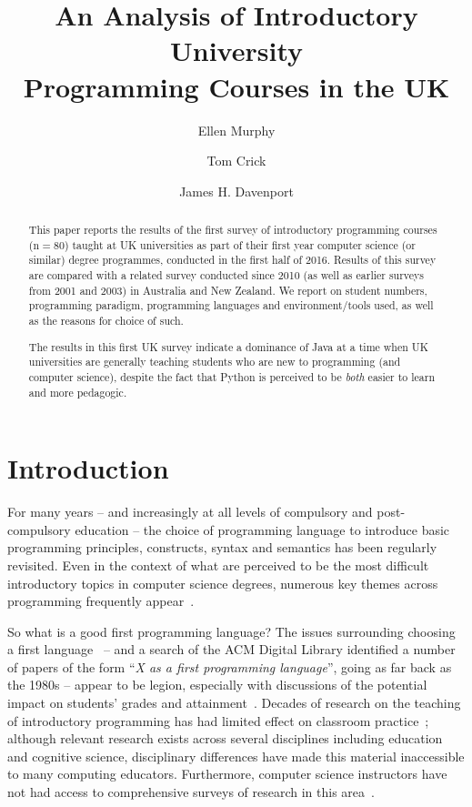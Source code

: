 \documentclass[a4paper,11pt]{article}
\title{An Analysis of Introductory University\\Programming Courses in
  the UK}
\author[1]{Ellen Murphy}
\author[2]{Tom Crick}
\author[3]{James H. Davenport}
\affil[1]{Institute for Mathematical Innovation, University of Bath, UK}
\affil[2]{Dept. of Computing, Cardiff Metropolitan University, UK}
\affil[3]{Dept. of Computer Science, University of Bath, UK}
\affil[1]{\url{e.murphy@bath.ac.uk}}
\affil[2]{\url{tcrick@cardiffmet.ac.uk}}
\affil[3]{\url{j.h.davenport@bath.ac.uk}}
\begin{document}
\maketitle


\begin{abstract}
This paper reports the results of the first survey of introductory
programming courses ($\mathrm{n} = 80$) taught at UK universities as part of their
first year computer science (or similar) degree programmes, conducted
in the first half of 2016. Results of this survey are compared with a
related survey conducted since 2010 (as well as earlier surveys from
2001 and 2003) in Australia and New Zealand. We report on student
numbers, programming paradigm, programming languages and
environment/tools used, as well as the reasons for choice of such.

The results in this first UK survey indicate a dominance of Java at a
time when UK universities are generally teaching students who are new
to programming (and computer science), despite the fact that Python is
perceived to be \emph{both} easier to learn and more pedagogic.

\end{abstract}


\section{Introduction}\label{intro}

For many years -- and increasingly at all levels of compulsory and
post-compulsory education -- the choice of programming language to
introduce basic programming principles, constructs, syntax and
semantics has been regularly revisited. Even in the context of what
are perceived to be the most difficult introductory topics in computer
science degrees, numerous key themes across programming frequently
appear~\cite{dale:2006}. 

So what is a good first programming language? The issues surrounding
choosing a first language~\cite{gupta:2004,kaplan:2010} -- and a
search of the ACM Digital Library identified a number of papers of the
form ``{\emph{X as a first programming language}}'', going as far back
as the 1980s -- appear to be legion, especially with discussions of
the potential impact on students' grades and
attainment~\cite{ivanovic-et-al:2015}. Decades of research on the
teaching of introductory programming has had limited effect on
classroom practice~\cite{pears-et-al:2007}; although relevant research
exists across several disciplines including education and cognitive
science, disciplinary differences have made this material inaccessible
to many computing educators. Furthermore, computer science instructors
have not had access to comprehensive surveys of research in this
area~\cite{mccracken-et-al:2001,pears-et-al:2007}.
\end{document}
